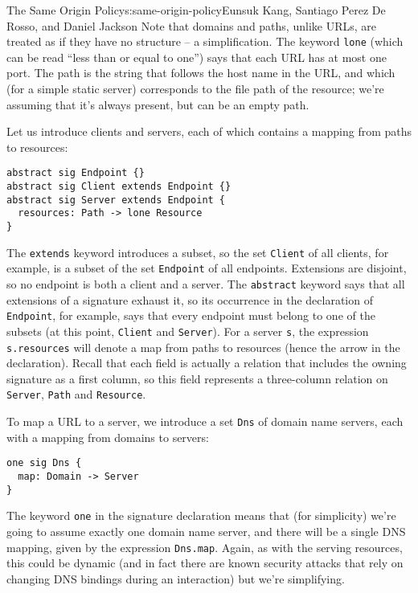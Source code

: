 \begin{aosachapter}{The Same Origin Policy}{s:same-origin-policy}{Eunsuk Kang, Santiago Perez De Rosso, and Daniel Jackson}
Note that domains and paths, unlike URLs, are treated as if they have no
structure -- a simplification. The keyword \texttt{lone} (which can be
read ``less than or equal to one'') says that each URL has at most one
port. The path is the string that follows the host name in the URL, and
which (for a simple static server) corresponds to the file path of the
resource; we're assuming that it's always present, but can be an empty
path.

Let us introduce clients and servers, each of which contains a mapping
from paths to resources:

\begin{verbatim}
abstract sig Endpoint {}
abstract sig Client extends Endpoint {}
abstract sig Server extends Endpoint {
  resources: Path -> lone Resource
}
\end{verbatim}

The \texttt{extends} keyword introduces a subset, so the set
\texttt{Client} of all clients, for example, is a subset of the set
\texttt{Endpoint} of all endpoints. Extensions are disjoint, so no
endpoint is both a client and a server. The \texttt{abstract} keyword
says that all extensions of a signature exhaust it, so its occurrence in
the declaration of \texttt{Endpoint}, for example, says that every
endpoint must belong to one of the subsets (at this point,
\texttt{Client} and \texttt{Server}). For a server \texttt{s}, the
expression \texttt{s.resources} will denote a map from paths to
resources (hence the arrow in the declaration). Recall that each field
is actually a relation that includes the owning signature as a first
column, so this field represents a three-column relation on
\texttt{Server}, \texttt{Path} and \texttt{Resource}.

To map a URL to a server, we introduce a set \texttt{Dns} of domain name
servers, each with a mapping from domains to servers:

\begin{verbatim}
one sig Dns {
  map: Domain -> Server
}
\end{verbatim}

The keyword \texttt{one} in the signature declaration means that (for
simplicity) we're going to assume exactly one domain name server, and
there will be a single DNS mapping, given by the expression
\texttt{Dns.map}. Again, as with the serving resources, this could be
dynamic (and in fact there are known security attacks that rely on
changing DNS bindings during an interaction) but we're simplifying.


\end{aosachapter}

